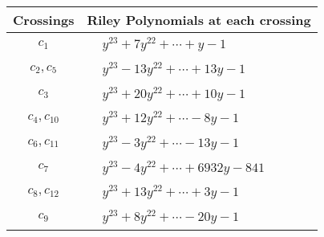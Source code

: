 \documentclass[1p]{elsarticle_modified}
\theoremstyle{definition}
\begin{document}
\begin{tabular}{m{50pt}|m{274pt}}
Crossings & \hspace{64pt}Riley Polynomials at each crossing \\
\hline $$\begin{aligned}c_{1}\end{aligned}$$&$\begin{aligned}
&y^{23}+7 y^{22}+\cdots+y-1
\end{aligned}$\\
\hline $$\begin{aligned}c_{2},c_{5}\end{aligned}$$&$\begin{aligned}
&y^{23}-13 y^{22}+\cdots+13 y-1
\end{aligned}$\\
\hline $$\begin{aligned}c_{3}\end{aligned}$$&$\begin{aligned}
&y^{23}+20 y^{22}+\cdots+10 y-1
\end{aligned}$\\
\hline $$\begin{aligned}c_{4},c_{10}\end{aligned}$$&$\begin{aligned}
&y^{23}+12 y^{22}+\cdots-8 y-1
\end{aligned}$\\
\hline $$\begin{aligned}c_{6},c_{11}\end{aligned}$$&$\begin{aligned}
&y^{23}-3 y^{22}+\cdots-13 y-1
\end{aligned}$\\
\hline $$\begin{aligned}c_{7}\end{aligned}$$&$\begin{aligned}
&y^{23}-4 y^{22}+\cdots+6932 y-841
\end{aligned}$\\
\hline $$\begin{aligned}c_{8},c_{12}\end{aligned}$$&$\begin{aligned}
&y^{23}+13 y^{22}+\cdots+3 y-1
\end{aligned}$\\
\hline $$\begin{aligned}c_{9}\end{aligned}$$&$\begin{aligned}
&y^{23}+8 y^{22}+\cdots-20 y-1
\end{aligned}$\\
\hline
\end{tabular}\\~\\
\end{document}
